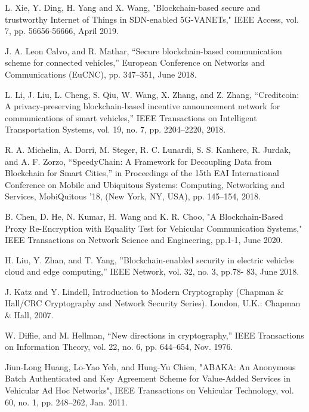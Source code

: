 \documentclass[journal,10pt]{IEEEtran}
\begin{document}
\begin{thebibliography}{1}
L. Xie, Y. Ding, H. Yang and X. Wang, "Blockchain-based secure and trustworthy Internet of Things in SDN-enabled 5G-VANETs," IEEE Access, vol. 7, pp. 56656-56666, April 2019.

J. A. Leon Calvo, and R. Mathar, “Secure blockchain-based communication scheme for connected vehicles,” European Conference on Networks and Communications (EuCNC), pp. 347–351, June 2018.

L. Li, J. Liu, L. Cheng, S. Qiu, W. Wang, X. Zhang, and Z. Zhang, “Creditcoin: A privacy-preserving blockchain-based incentive announcement network for communications of smart vehicles,” IEEE Transactions on Intelligent Transportation Systems, vol. 19, no. 7, pp. 2204–2220, 2018.

R. A. Michelin, A. Dorri, M. Steger, R. C. Lunardi, S. S. Kanhere, R. Jurdak, and A. F. Zorzo, “SpeedyChain: A Framework for Decoupling Data from Blockchain for Smart Cities,” in Proceedings of the 15th EAI International Conference on Mobile and Ubiquitous Systems: Computing, Networking and Services, MobiQuitous ’18, (New York, NY, USA), pp. 145–154, 2018.

B. Chen, D. He, N. Kumar, H. Wang and K. R. Choo, "A Blockchain-Based Proxy Re-Encryption with Equality Test for Vehicular Communication Systems,"  IEEE Transactions on Network Science and Engineering, pp.1-1, June 2020.

H. Liu, Y. Zhan, and T. Yang, ”Blockchain-enabled security in electric vehicles cloud and edge computing,” IEEE Network, vol. 32, no. 3, pp.78- 83, June 2018.

J. Katz and Y. Lindell, Introduction to Modern Cryptography (Chapman $\&$ Hall/CRC Cryptography and Network Security Series). London, U.K.: Chapman & Hall, 2007.

W. Diffie, and M. Hellman, “New directions in cryptography,” IEEE Transactions on Information Theory, vol. 22, no. 6, pp. 644–654, Nov. 1976.

Jiun-Long Huang, Lo-Yao Yeh, and Hung-Yu Chien, "ABAKA: An Anonymous Batch Authenticated and Key Agreement Scheme for Value-Added Services in Vehicular Ad Hoc Networks", IEEE Transactions on Vehicular Technology, vol. 60, no. 1, pp. 248–262, Jan. 2011.


\end{thebibliography}
\end{document}
